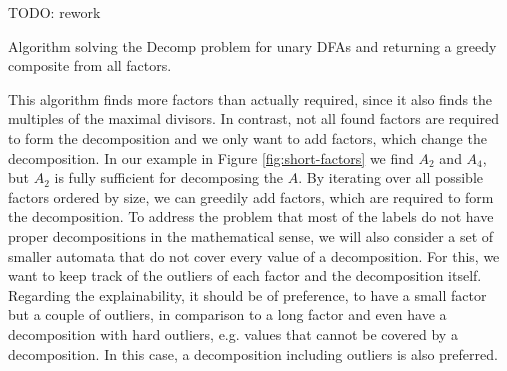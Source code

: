 TODO: rework

\begin{algorithm}[H]
	\label{algo:composite}
	\DontPrintSemicolon
	
	
	
	
	\caption{Algorithm solving the Decomp problem for unary DFAs and returning a greedy composite from all factors.}
\end{algorithm}

This algorithm finds more factors than actually required, since it also finds the multiples of the maximal divisors. In contrast, not all found factors are required to form the decomposition and we only want to add factors, which change the decomposition. In our example in Figure \ref{fig:short-factors} we find $A_2$ and $A_4$, but $A_2$ is fully sufficient for decomposing the \DFA $A$. By iterating over all possible factors ordered by size, we can greedily add factors, which are required to form the decomposition. To address the problem that most of the labels do not have proper decompositions in the mathematical sense, we will also consider a set of smaller automata that do not cover every value of a decomposition. For this, we want to keep track of the outliers of each factor and the decomposition itself. Regarding the explainability, it should be of preference, to have a small factor but a couple of outliers, in comparison to a long factor and even have a decomposition with hard outliers, e.g. values that cannot be covered by a decomposition. In this case, a decomposition including outliers is also preferred.

